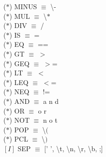 \documentclass[\main/MemoriaPL.tex]{subfiles}
\begin{document}
    \vspace{2mm}
    \hspace{5mm}($\ast$) MINUS $\equiv$ \textbackslash - \\
    \vspace{2mm}
    \hspace{5mm}($\ast$) MUL $\equiv$ \textbackslash $\ast$ \\
    \vspace{2mm}
    \hspace{5mm}($\ast$) DIV $\equiv$ / \\
    \vspace{2mm}
    \hspace{5mm}($\ast$) IS $\equiv$ = \\
    \vspace{2mm}
    \hspace{5mm}($\ast$) EQ $\equiv$ == \\
    \vspace{2mm}
    \hspace{5mm}($\ast$) GT $\equiv$ $>$ \\
    \vspace{2mm}
    \hspace{5mm}($\ast$) GEQ $\equiv$ $>$= \\
    \vspace{2mm}
    \hspace{5mm}($\ast$) LT $\equiv$ $<$ \\
    \vspace{2mm}
    \hspace{5mm}($\ast$) LEQ $\equiv$ $<$= \\
    \vspace{2mm}
    \hspace{5mm}($\ast$) NEQ $\equiv$ != \\
    \vspace{2mm}
    \hspace{5mm}($\ast$) AND $\equiv$ a n d \\
    \vspace{2mm}
    \hspace{5mm}($\ast$) OR $\equiv$ o r \\
    \vspace{2mm}
    \hspace{5mm}($\ast$) NOT $\equiv$ n o t \\
    \vspace{2mm}
    \hspace{5mm}($\ast$) POP $\equiv$ \textbackslash $($ \\
    \vspace{2mm}
    \hspace{5mm}($\ast$) PCL $\equiv$ \textbackslash $)$ \\
    \vspace{2mm}
    \hspace{5mm}$[I]$ SEP $\equiv$ $[$' ', \textbackslash t, \textbackslash n, \textbackslash r, \textbackslash b, ;] \\
\end{document}
